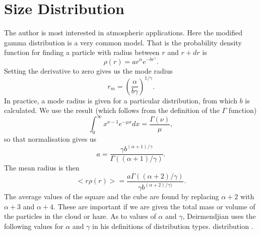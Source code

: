 \section{Size Distribution}

The author is most interested in atmospheric applications. Here the  modified
gamma distribution is a very common model.
That is the probability density function for finding a particle
with radius between $r$ and $r+dr$ is
\begin{equation}
\rho(r)= a r^\alpha e^{-b r^\gamma}.
\end{equation}
Setting the derivative to zero gives us the mode radius
\begin{equation}
r_m= \left ( \frac{\alpha}{ b \gamma } \right )^{1/\gamma}.
\end{equation}
In practice, a mode radius is given for a particular distribution, from which 
$b$ is calculated.
We use the result (which follows from the definition of the $\Gamma$ function)
\begin{equation}
\int_0^\infty x^{\nu-1} e^{-\mu x} d x= \frac{\Gamma (\nu)}{\mu},
\end{equation}
so that normalisation gives us
\begin{equation}
a= \frac{ \gamma b^{ (\alpha+1)/\gamma } }{ \Gamma((\alpha+1)/\gamma) }.
\end{equation}
The mean radius is then
\begin{equation}
< r \rho(r)> =\frac{ a \Gamma((\alpha+2)/\gamma) }{ \gamma b^{(\alpha+2)/\gamma)} }.
\end{equation}
The average values of the square and the cube are found by replacing
$\alpha+2$ with $\alpha+3$ and $\alpha+4$. These are important if
we are given the total mass or volume of the particles in the cloud or haze.
As to values of $\alpha$ and $\gamma$,
Deirmendjian uses the following values for $\alpha$ and $\gamma$ in his definitions
of distribution types.
distribution \cite{Deirmendjian:Mybib}. 
